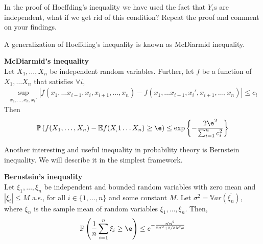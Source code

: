 \begin{exer}
In the proof of Hoeffding's inequality we have used the fact that $Y_i$s are independent, what if we get rid of this condition? Repeat the proof and comment on your findings.  
\end{exer}
A generalization of Hoeffding's inequality is known as McDiarmid inequality. 
\begin{thm}
\textbf{McDiarmid's inequality} \\
Let $X_1, \dots, X_n$ be independent random variables. Further, let $f$ be a function of $X_1, \dots X_n$ that satisfies $\forall i$, 
\begin{align}
\sup_{x_1, \dots, x_n, x_i'} |f(x_1, \dots x_{i-1}, x_i, x_{i+1}, \dots, x_n) - f(x_1, \dots x_{i-1}, x_i', x_{i+1}, \dots, x_n)| \le c_i
\end{align}
Then
\begin{align}
\mathbb{P}\left(f(X_1, \dots, X_n) - \mathbb{E} f(X_,1 \dots X_n) \ge \e \right) \le \exp\left\{-\frac{2\e^2}{\sum_{i=1}^n c_i^2}\right\}
\end{align}
\end{thm}
\begin{s}

\end{s}
Another interesting and useful inequality in probability theory is Bernstein inequality. We will describe it in the simplest framework. 
\begin{thm}
\textbf{Bernstein's inequality} \\
Let $\xi_1, \dots, \xi_n$ be independent and bounded random variables with zero mean and $|\xi_i| \le M$ a.s., for all $i \in \{1, \dots, n\}$ and some constant $M$. Let $\sigma^2 = \mathbb{V}ar(\overline{\xi_n})$, where $\overline{\xi_n}$ is the sample mean of random variables $\xi_1, \dots, \xi_n$. Then, 
\begin{align}
    \mathbb{P}\left(\frac{1}{n} \sum_{i=1}^n \xi_i \ge \e \right) \le e^{-\frac{n\e^2}{2\sigma^2 + 2/3 M\e}}
\end{align}
\end{thm}
\begin{s}

\end{s}
